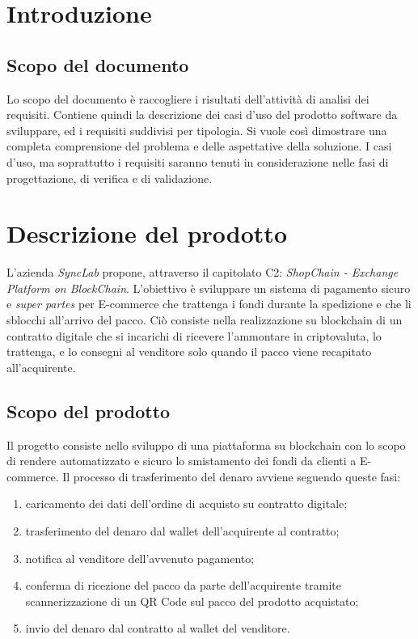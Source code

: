 \documentclass[a4paper, 12pt]{article}
\begin{document}
\makefrontpage

\makeversioni

\section{Introduzione}
\subsection{Scopo del documento}
Lo scopo del documento è raccogliere i risultati dell'attività di analisi dei requisiti. Contiene quindi la descrizione dei casi d'uso del prodotto software da sviluppare, ed i requisiti suddivisi per tipologia. Si vuole così dimostrare una completa comprensione del problema e delle aspettative della soluzione. I casi d'uso, ma soprattutto i requisiti saranno tenuti in considerazione nelle fasi di progettazione, di verifica e di validazione.

\section{Descrizione del prodotto}
L'azienda \textit{SyncLab} propone, attraverso il capitolato C2: \textit{ShopChain - Exchange Platform on
BlockChain}. L'obiettivo è sviluppare un sistema di pagamento sicuro e \textit{super partes} per E-commerce che trattenga i fondi durante la spedizione e che li sblocchi all'arrivo del pacco. Ciò consiste nella realizzazione su blockchain di un contratto digitale che si incarichi di ricevere l’ammontare in criptovaluta, lo trattenga, e lo consegni al venditore solo quando il pacco viene recapitato all’acquirente.
\subsection{Scopo del prodotto}
Il progetto consiste nello sviluppo di una piattaforma su blockchain con lo scopo di rendere automatizzato e sicuro lo smistamento dei fondi da clienti a E-commerce. Il processo di trasferimento del denaro avviene seguendo queste fasi:
\begin{enumerate}
\item caricamento dei dati dell'ordine di acquisto su contratto digitale;
\item trasferimento del denaro dal wallet dell'acquirente al contratto;
\item notifica al venditore dell'avvenuto pagamento;
\item conferma di ricezione del pacco da parte dell'acquirente tramite scannerizzazione di un QR Code sul pacco del prodotto acquistato;
\item invio del denaro dal contratto al wallet del venditore.
\end{enumerate}
\end{document}
